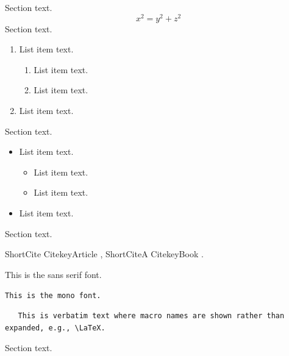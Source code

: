 \documentclass[
  draft
]{agujournal2025}
\begin{document}
Section text.
 \begin{equation}
 x^2=y^2 + z^2
 \end{equation}
Section text.
%
\begin{enumerate}
    \item List item text.
        \begin{enumerate} %
          \item List item text.
          \item List item text.
        \end{enumerate}
    \item List item text.
\end{enumerate}
Section text.
\begin{itemize}
    \item List item text.
        \begin{itemize}
          \item List item text. 
          \item List item text.
        \end{itemize}
    \item List item text.
\end{itemize}
Section text.

ShortCite CitekeyArticle \cite{CitekeyArticle}, ShortCiteA CitekeyBook . 

\textsf{This is the sans serif font.}

 \texttt{This is the mono font.}
 

\begin{verbatim}  
   This is verbatim text where macro names are shown rather than expanded, e.g., \LaTeX.
\end{verbatim}

Section text.



%
\end{document}

